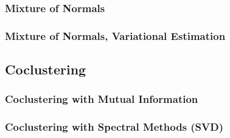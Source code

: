 \documentclass[11pt,letterpaper]{article}
\numberwithin{equation}{section}
\begin{document}
\subsubsection{Mixture of Normals}
\subsubsection{Mixture of Normals, Variational Estimation}

\subsection{Coclustering}


\subsubsection{Coclustering with Mutual Information}
\subsubsection{Coclustering with Spectral Methods (SVD)}
\end{document}
